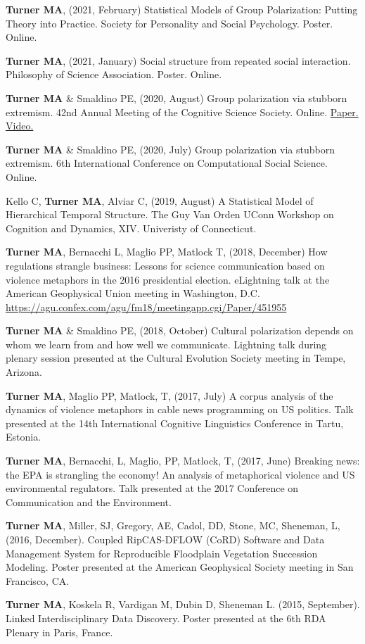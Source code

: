 \documentclass[letterpaper,11pt,oneside]{article}
\begin{document}
  \begin{hangparas}{0.25in}{1}
    \textbf{Turner MA}, (2021, February) Statistical Models of Group Polarization: Putting Theory into Practice. Society for Personality and Social Psychology. Poster. Online.

    \textbf{Turner MA}, (2021, January) Social structure from repeated social interaction. Philosophy of Science Association. Poster. Online.

    \textbf{Turner MA} \& Smaldino PE, (2020, August) Group polarization via stubborn extremism. 42nd Annual Meeting of the Cognitive Science Society. Online. \href{https://www.researchgate.net/publication/342153646_Stubborn_extremism_as_a_potential_pathway_to_group_polarization}{Paper.} \href{https://youtu.be/i5PHjwu1p40}{Video.}

   \textbf{Turner MA} \& Smaldino PE, (2020, July) Group polarization via stubborn extremism. 6th International Conference on Computational Social Science. Online.

Kello C, \textbf{Turner MA}, Alviar C, (2019, August) A Statistical Model of Hierarchical Temporal Structure. The Guy Van Orden UConn Workshop on Cognition and Dynamics, XIV. Univeristy of Connecticut.

\textbf{Turner MA}, Bernacchi L, Maglio PP, Matlock T, (2018, December) How regulations strangle business: Lessons for science communication based on violence metaphors in the 2016 presidential election. eLightning talk at the American Geophysical Union meeting in Washington, D.C. \url{https://agu.confex.com/agu/fm18/meetingapp.cgi/Paper/451955}

\textbf{Turner MA} \& Smaldino PE, (2018, October) Cultural polarization depends on whom we learn from and how well we communicate. Lightning talk during plenary session presented at the Cultural Evolution Society meeting in Tempe, Arizona.

\textbf{Turner MA}, Maglio PP, Matlock, T, (2017, July) A corpus analysis of the dynamics of violence metaphors in cable news programming on US politics. Talk presented at the 14th International Cognitive Linguistics Conference in Tartu, Estonia.

\textbf{Turner MA}, Bernacchi, L, Maglio, PP, Matlock, T, (2017, June) Breaking news: the EPA is strangling the economy! An analysis of metaphorical violence and US environmental regulators. Talk presented at the 2017 Conference on Communication and the Environment.

\textbf{Turner MA}, Miller, SJ, Gregory, AE, Cadol, DD, Stone, MC, Sheneman, L, (2016, December). Coupled RipCAS-DFLOW (CoRD) Software and Data Management System for Reproducible Floodplain Vegetation Succession Modeling. Poster presented at the American Geophysical Society meeting in San Francisco, CA.

\textbf{Turner MA}, Koskela R, Vardigan M, Dubin D, Sheneman L. (2015, September). Linked Interdisciplinary Data Discovery. Poster presented at the 6th RDA Plenary in Paris, France. 
  \end{hangparas}
\end{document}
